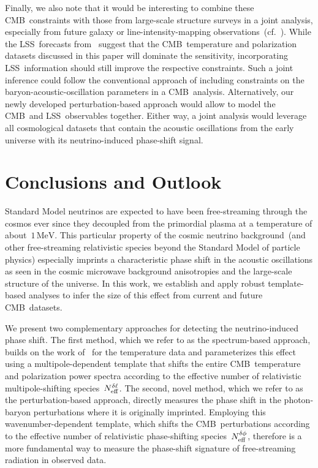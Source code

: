 Finally, we also note that it would be interesting to combine these CMB~constraints with those from large-scale structure surveys in a joint analysis, especially from future galaxy or line-intensity-mapping observations~(cf.~\cite{CosmicVisions21cm:2018rfq, PUMA:2019jwd, Karkare:2022bai, DESI:2022lza, Schlegel:2022vrv}). While the LSS~forecasts from~\cite{Baumann:2017gkg} suggest that the CMB~temperature and polarization datasets discussed in this paper will dominate the sensitivity, incorporating LSS~information should still improve the respective constraints. Such a joint inference could follow the conventional approach of including constraints on the baryon-acoustic-oscillation parameters in a CMB~analysis. Alternatively, our newly developed perturbation-based approach would allow to model the CMB~and LSS~observables together. Either way, a joint analysis would leverage all cosmological datasets that contain the acoustic oscillations from the early universe with its neutrino-induced phase-shift signal.




\section{Conclusions and Outlook}
\label{ch12-sec:conclusions}

Standard Model neutrinos are expected to have been free-streaming through the cosmos ever since they decoupled from the primordial plasma at a temperature of about~$1\,\mathrm{MeV}$. This particular property of the cosmic neutrino background~(and other free-streaming relativistic species beyond the Standard Model of particle physics) especially imprints a characteristic phase shift in the acoustic oscillations as seen in the cosmic microwave background anisotropies and the large-scale structure of the universe. In this work, we establish and apply robust template-based analyses to infer the size of this effect from current and future CMB~datasets.\medskip

We present two complementary approaches for detecting the neutrino-induced phase shift. The first method, which we refer to as the spectrum-based approach, builds on the work of~\cite{Follin:2015hya} for the temperature data and parameterizes this effect using a multipole-dependent template that shifts the entire CMB~temperature and polarization power spectra according to the effective number of relativistic multipole-shifting species~$N_\mathrm{eff}^{\delta\ell}$. The second, novel method, which we refer to as the perturbation-based approach, directly measures the phase shift in the photon-baryon perturbations where it is originally imprinted. Employing this wavenumber-dependent template, which shifts the CMB~perturbations according to the effective number of relativistic phase-shifting species~$N_\mathrm{eff}^{\delta\phi}$, therefore is a more fundamental way to measure the phase-shift signature of free-streaming radiation in observed data.

